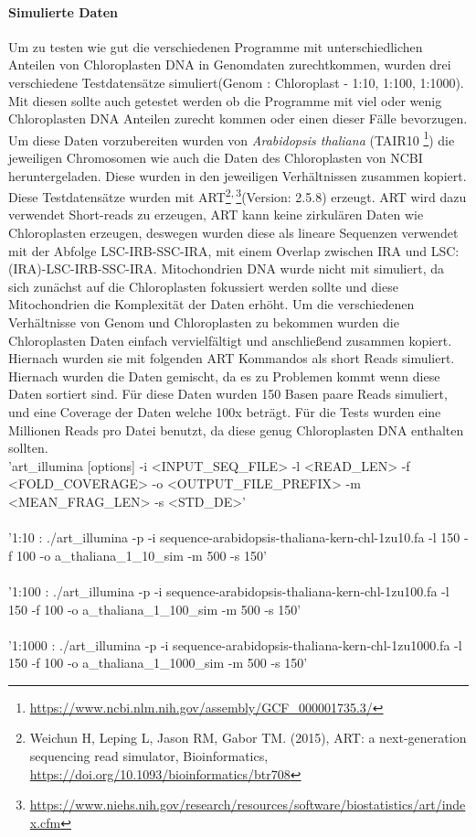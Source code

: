 \documentclass{scrartcl}
\begin{document}
\paragraph{Simulierte Daten}
\label{sec-3-1-1-1}
Um zu testen wie gut die verschiedenen Programme mit unterschiedlichen Anteilen von Chloroplasten DNA in
Genomdaten zurechtkommen, wurden drei verschiedene Testdatensätze simuliert(Genom : Chloroplast - 1:10, 1:100, 1:1000). 
Mit diesen sollte auch getestet werden ob die Programme mit viel oder wenig Chloroplasten DNA Anteilen zurecht kommen oder einen dieser Fälle 
bevorzugen. Um diese Daten vorzubereiten wurden von \emph{Arabidopsis thaliana} (TAIR10 \footnote{\url{https://www.ncbi.nlm.nih.gov/assembly/GCF_000001735.3/}}) die jeweiligen Chromosomen wie auch die Daten
des Chloroplasten von NCBI\footnotemark[36]{} heruntergeladen. Diese wurden in den jeweiligen Verhältnissen zusammen kopiert.
Diese Testdatensätze wurden mit ART\footnote{Weichun H, Leping L, Jason RM, Gabor TM. (2015), ART: a next-generation sequencing read simulator, Bioinformatics, \url{https://doi.org/10.1093/bioinformatics/btr708}}\textsuperscript{,}\,\footnote{\url{https://www.niehs.nih.gov/research/resources/software/biostatistics/art/index.cfm}}(Version: 2.5.8) erzeugt. ART wird dazu verwendet Short-reads zu erzeugen, ART kann keine zirkulären Daten wie Chloroplasten 
erzeugen, deswegen wurden diese als lineare Sequenzen verwendet mit der Abfolge LSC-IRB-SSC-IRA, mit einem Overlap zwischen IRA und LSC: (IRA)-LSC-IRB-SSC-IRA. 
Mitochondrien DNA wurde nicht mit simuliert, da sich zunächst auf die Chloroplasten fokussiert werden sollte und diese Mitochondrien die Komplexität der Daten
erhöht.
Um die verschiedenen Verhältnisse von Genom und Chloroplasten zu bekommen wurden die Chloroplasten Daten einfach
vervielfältigt und anschließend zusammen kopiert. Hiernach wurden sie mit folgenden ART Kommandos als short Reads simuliert.
Hiernach wurden die Daten gemischt, da es zu Problemen kommt wenn diese Daten sortiert sind. Für diese Daten wurden 150 Basen paare Reads simuliert, 
und eine Coverage der Daten welche 100x beträgt. 
Für die Tests wurden eine Millionen Reads pro Datei benutzt, da diese genug Chloroplasten DNA enthalten sollten.
\\
{\small 'art\_illumina [options] -i <INPUT\_SEQ\_FILE> -l <READ\_LEN> -f <FOLD\_COVERAGE>
-o <OUTPUT\_FILE\_PREFIX> -m <MEAN\_FRAG\_LEN> -s <STD\_DE>'}
\\
\\
'1:10 : ./art\_illumina -p -i sequence-arabidopsis-thaliana-kern-chl-1zu10.fa -l 150 -f 100 
-o a\_thaliana\_1\_10\_sim -m 500 -s 150'
\\
\\
'1:100 :  ./art\_illumina -p -i sequence-arabidopsis-thaliana-kern-chl-1zu100.fa -l 150 -f 100 
-o a\_thaliana\_1\_100\_sim -m 500 -s 150'
\\
\\
'1:1000 :  ./art\_illumina -p -i sequence-arabidopsis-thaliana-kern-chl-1zu1000.fa -l 150 -f 100 
-o a\_thaliana\_1\_1000\_sim -m 500 -s 150'
\end{document}
